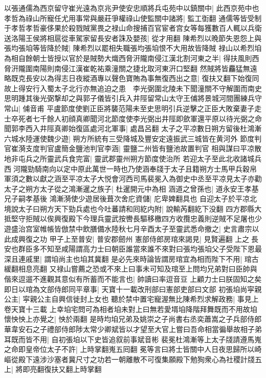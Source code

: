 以張通儒為西京留守崔光遠為京兆尹使安忠順將兵屯苑中以鎮關中|{
	此西京苑中也}
孝哲為祿山所寵任尤用事常與嚴莊爭權祿山使監關中諸將|{
	監工衘翻}
通儒等皆受制于孝哲孝哲豪侈果於殺戮賊黨畏之禄山命搜捕百官宦者宫女等每獲數百人輒以兵衛送洛陽王侯將相扈從車駕家留長安者誅及嬰孩|{
	從才用翻}
陳希烈以晩節失恩怨上與張均張垍等皆降於賊|{
	陳希烈以罷相失職張均張垍恨不大用故皆降賊}
禄山以希烈垍為相自餘朝士皆授以官於是賊勢大熾西脅汧隴南侵江漢北割河東之半|{
	得扶風則西脅汧隴圍南陽則南侵江漢崔乾祐乘潼關之捷北取河東汧口堅翻}
然賊將皆麤猛無遠略既克長安以為得志日夜縱酒專以聲色寶賄為事無復西出之意|{
	復扶又翻下始復同}
故上得安行入蜀太子北行亦無追迫之患　李光弼圍北陵未下聞潼關不守解圍而南史思明踵其後光弼撃却之與郭子儀皆引兵入井陘留常山太守王俌將景城河間團練兵守常山|{
	俌音甫}
平盧節度使劉正臣將襲范陽未至史思明引兵逆擊之正臣大敗棄妻子走士卒死者七千餘人初顔真卿聞河北節度使李光弼出井陘即歛軍還平原以待光弼之命聞郭李西入井陘真卿始復區處河北軍事|{
	處昌呂翻}
太子之平凉數日朔方留後杜鴻漸六城水陸運使魏少遊|{
	朔方所統有三受降城及豐安定遠振武三城皆在黄河外}
節度判官崔漪支度判官盧簡金鹽池判官李涵|{
	靈鹽二州皆有鹽池故置判官}
相與謀曰平凉散地非屯兵之所靈武兵食完富|{
	靈武郡靈州朔方節度使治所}
若迎太子至此北收諸城兵西河隴勁騎南向以定中原此萬世一時也乃使涵奉牋于太子且籍朔方士馬甲兵穀帛軍須之數以獻之涵至平凉太子大悦會河西司馬裴冕入為御史中丞至平凉見太子亦勸太子之朔方太子從之鴻漸暹之族子|{
	杜暹開元中為相}
涵道之曾孫也|{
	道永安王孝基兄子嗣孝基後}
鴻漸漪使少遊居後葺次舍庀資儲|{
	庀卑婢翻具也}
自迎太子於平凉北境說太子曰朔方天下勁兵處也今吐蕃請和囘紇内附|{
	說輸芮翻紇下没翻}
四方郡縣大抵堅守拒賊以俟興復殿下今理兵靈武按轡長驅移檄四方收攬忠義則逆賊不足屠也少遊盛治宫室帷帳皆倣禁中飲膳備水陸秋七月辛酉太子至靈武悉命撤之|{
	史言肅宗以此成興復之功}
甲子上至普安|{
	普安郡劒州}
憲部侍郎房琯來謁見|{
	見賢遍翻}
上之長安也群臣多不知至咸陽謂高力士曰朝臣誰當來誰不來對曰張均張垍父子受陛下恩最深且連戚里|{
	謂垍尚主也垍其冀翻}
是必先來時論皆謂房琯宜為相而陛下不用|{
	琯古緩翻相息亮翻}
又禄山嘗薦之恐或不來上曰事未可知及琯至上問均兄弟對曰臣帥與偕來逗遛不進觀其意似有所蓄而不能言也|{
	帥讀曰率逗音豆}
上顧力士曰朕固知之矣即日以琯為文部侍郎同平章事|{
	天寶十一載改刑部曰憲部吏部曰文部}
初張垍尚寜親公主|{
	寜親公主自興信徙封上女也}
聽於禁中置宅寵渥無比陳希烈求解政務|{
	事見上卷天寶十三載}
上幸垍宅問可為相者垍未對上曰無若愛壻垍降階拜舞既而不用故垍懷怏怏上亦覺之|{
	怏於兩翻}
是時均垍兄弟及姚崇之子尚書右丞奕蕭嵩之子兵部侍郎華韋安石之子禮部侍郎陟太常少卿斌皆以才望至大官上嘗曰吾命相當徧舉故相子弟耳既而皆不用|{
	自初張垍以下史皆追叙前事斌音彬}
裴冕杜鴻漸等上太子牋請遵馬嵬之命即皇帝位太子不許|{
	上時掌翻嵬五囘翻}
冕等言曰將士皆關中人日夜思歸所以崎嶇從殿下遠涉沙塞者冀尺寸之功若一朝離散不可復集願殿下勉狥衆心為社稷計牋五上|{
	將即亮翻復扶又翻上時掌翻}

